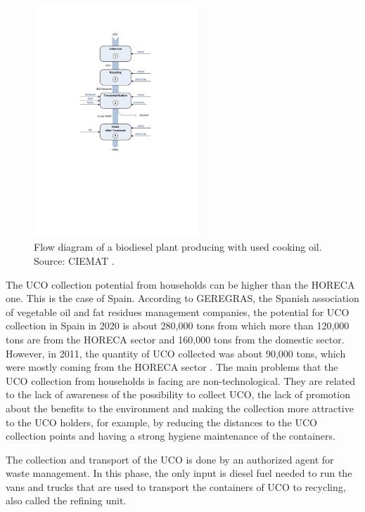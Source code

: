 \documentclass[sustainability,article,accept,moreauthors,pdftex,12pt,a4paper]{mdpi}
\begin{document}
\begin{figure}[H]
\centering
\includegraphics[width=0.55\textwidth]{Figure1}
\caption[Flow diagram of a biodiesel plant producing with Used Cooking Oil]{Flow diagram of a biodiesel plant producing with used cooking oil. Source: CIEMAT \cite{CIEMAT2005}. } 
\label{fig1}
\end{figure}
 
The UCO collection potential from households can be higher than the HORECA one. This is the case of Spain. According to GEREGRAS, the Spanish association of vegetable oil and fat residues management companies, the potential for UCO collection in Spain in 2020 is about 280,000 tons from which more than 120,000 tons are from the HORECA sector and 160,000 tons from the domestic sector. However, in 2011, the quantity of UCO collected was about 90,000 tons, which were mostly coming from the HORECA sector \cite{IDAEPER}. The main problems that the UCO collection from households is facing are non-technological. They are related to the lack of awareness of the possibility to collect UCO, the lack of promotion about the benefits to the environment and making the collection more attractive to the UCO holders, for example, by reducing the distances to the UCO collection points and having a strong hygiene maintenance of the containers.
 
The collection and transport of the UCO is done by an authorized agent for waste management. In this phase, the only input is diesel fuel needed to run the vans and trucks that are used to transport the containers of UCO to recycling, also called the refining unit.
\end{document}
